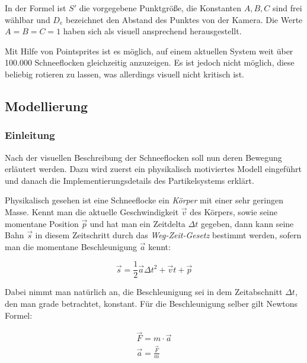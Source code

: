 In der Formel ist $S'$ die vorgegebene Punktgröße, die Konstanten
$A,B,C$ sind frei wählbar und $D_e$ bezeichnet den Abstand des Punktes
von der Kamera. Die Werte $A=B=C=1$ haben sich als visuell ansprechend
herausgestellt.

Mit Hilfe von Pointsprites ist es möglich, auf einem aktuellen System
weit über 100.000 Schneeflocken gleichzeitig anzuzeigen. Es ist jedoch
nicht möglich, diese beliebig rotieren zu lassen, was allerdings
visuell nicht kritisch ist.

\subsection{Modellierung}

\subsubsection{Einleitung}

Nach der visuellen Beschreibung der Schneeflocken soll nun deren
Bewegung erläutert werden. Dazu wird zuerst ein physikalisch
motiviertes Modell eingeführt und danach die Implementierungsdetails
des Partikelsystems erklärt.

Physikalisch gesehen ist eine Schneeflocke ein \emph{Körper} mit einer
sehr geringen Masse. Kennt man die aktuelle Geschwindigkeit $\vec{v}$
des Körpers, sowie seine momentane Position $\vec{p}$ und hat man ein
Zeitdelta $\Delta t$ gegeben, dann kann seine Bahn $\vec{s}$ in diesem
Zeitschritt durch das \emph{Weg-Zeit-Gesetz} bestimmt werden, sofern
man die momentane Beschleunigung $\vec{a}$ kennt:

\begin{equation}
\label{eq:implementation_snowflake_path_time_law}
\vec{s} = \frac{1}{2} \vec{a} \Delta t^2 + \vec{v}t + \vec{p}
\end{equation}

Dabei nimmt man natürlich an, die Beschleunigung sei in dem
Zeitabschnitt $\Delta t$, den man grade betrachtet, konstant. Für die
Beschleunigung selber gilt Newtons Formel:

\begin{gather}
\vec{F} = m \cdot \vec{a} \\
\vec{a} = \frac{\vec{F}}{m}
\end{gather}


